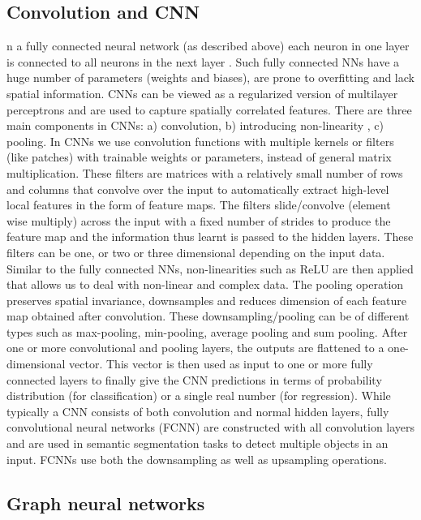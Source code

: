 \documentclass[pdflatex,sn-mathphys]{sn-jnl}%
\theoremstyle{thmstyleone}%
\theoremstyle{thmstyletwo}%
\theoremstyle{thmstylethree}%
\begin{document}
\subsection{Convolution and CNN}\label{sec:cnn}
n a fully connected neural network (as described above) each neuron in one layer is connected to all neurons in the next layer \cite{lecun1995convolutional}. Such fully connected NNs have a huge number of parameters (weights and biases), are prone to overfitting and lack spatial information. CNNs can be viewed as a regularized version of multilayer perceptrons and are used to capture spatially correlated features. There are three main components in CNNs: a) convolution, b) introducing non-linearity , c) pooling. 
In CNNs we use convolution functions with multiple kernels or filters (like patches) with trainable weights or parameters, instead of general matrix multiplication. These filters are matrices with a relatively small number of rows and columns that convolve over the input to automatically extract high-level local features in the form of feature maps. The filters slide/convolve (element wise multiply) across the input with a fixed number of strides to produce the feature map and the information thus learnt is passed to the hidden layers. These filters can be one, or two or three dimensional depending on the input data. 
Similar to the fully connected NNs, non-linearities such as ReLU are then applied that allows us to deal with non-linear and complex data. The pooling operation preserves spatial invariance, downsamples and reduces dimension of each feature map obtained after convolution. These downsampling/pooling can be of different types such as max-pooling, min-pooling, average pooling and sum pooling. 
After one or more convolutional and pooling layers, the outputs are flattened to a one-dimensional vector. This vector is then used as input to one or more fully connected layers to finally give the CNN predictions in terms of probability distribution (for classification) or a single real number (for regression). While typically a CNN consists of both convolution and normal hidden layers, fully convolutional neural networks (FCNN) are constructed with all convolution layers and are used in semantic segmentation tasks to detect multiple objects in an input. FCNNs use both the downsampling as well as upsampling operations.

\subsection{Graph neural networks}\label{sec:gnn}
\end{document}
